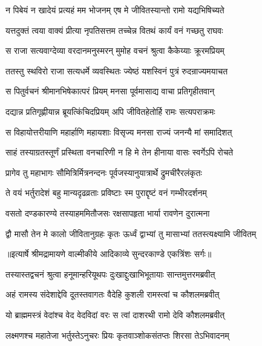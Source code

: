 \twolineshloka
{न पिबेयं न खादेयं प्रत्यहं मम भोजनम्}
{एष मे जीवितस्यान्तो रामो यद्यभिषिच्यते} %

\twolineshloka
{यत्तदुक्तं त्वया वाक्यं प्रीत्या नृपतिसत्तम}
{तच्चेन्न वितथं कार्यं वनं गच्छतु राघवः} %

\twolineshloka
{स राजा सत्यवाग्देव्या वरदानमनुस्मरन्}
{मुमोह वचनं श्रुत्वा कैकेय्याः क्रूरमप्रियम्} %

\twolineshloka
{ततस्तु स्थविरो राजा सत्यधर्मे व्यवस्थितः}
{ज्येष्ठं यशस्विनं पुत्रं रुदन्राज्यमयाचत} %

\twolineshloka
{स पितुर्वचनं श्रीमानभिषेकात्परं प्रियम्}
{मनसा पूर्वमासाद्य वाचा प्रतिगृहीतवान्} %

\twolineshloka
{दद्यान्न प्रतिगृह्णीयान्न ब्रूयत्किंचिदप्रियम्}
{अपि जीवितहेतोर्हि रामः सत्यपराक्रमः} %

\twolineshloka
{स विहायोत्तरीयाणि महार्हाणि महायशाः}
{विसृज्य मनसा राज्यं जनन्यै मां समादिशत्} %

\twolineshloka
{साहं तस्याग्रतस्तूर्णं प्रस्थिता वनचारिणी}
{न हि मे तेन हीनाया वासः स्वर्गेऽपि रोचते} %

\twolineshloka
{प्रागेव तु महाभागः सौमित्रिर्मित्रनन्दनः}
{पूर्वजस्यानुयात्रार्थे द्रुमचीरैरलंकृतः} %

\twolineshloka
{ते वयं भर्तुरादेशं बहु मान्यदृढव्रताः}
{प्रविष्टाः स्म पुराद्दृष्टं वनं गम्भीरदर्शनम्} %

\twolineshloka
{वसतो दण्डकारण्ये तस्याहममितौजसः}
{रक्षसापहृता भार्या रावणेन दुरात्मना} %

\twolineshloka
{द्वौ मासौ तेन मे कालो जीवितानुग्रहः कृतः}
{ऊर्ध्वं द्वाभ्यां तु मासाभ्यां ततस्त्यक्ष्यामि जीवितम्} %


{॥इत्यार्षे श्रीमद्रामायणे वाल्मीकीये आदिकाव्ये सुन्दरकाण्डे एकत्रिंशः सर्गः॥}


\twolineshloka
{तस्यास्तद्वचनं श्रुत्वा हनूमान्हरियूथपः}
{दुःखाद्दुःखाभिभूतायाः सान्तमुत्तरमब्रवीत्} %

\twolineshloka
{अहं रामस्य संदेशाद्देवि दूतस्तवागतः}
{वैदेहि कुशली रामस्त्वां च कौशलमब्रवीत्} %

\twolineshloka
{यो ब्राह्ममस्त्रं वेदांश्च वेद वेदविदां वरः}
{स त्वां दाशरथी रामो देवि कौशलमब्रवीत्} %

\twolineshloka
{लक्ष्मणश्च महातेजा भर्तुस्तेऽनुचरः प्रियः}
{कृतवाञ्शोकसंतप्तः शिरसा तेऽभिवादनम्} %

